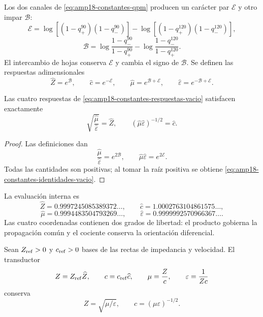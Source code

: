 Los dos canales de \eqref{eq:amp18-constantes-qpm} producen un carácter par
\(\mathcal E\) y otro impar \(\mathcal B\):
\begin{equation}
 \label{eq:amp18-constantes-e-vacio}
 \mathcal E=
 \log[(1-q_+^{90})(1-q_-^{90})]
 -\log[(1-q_+^{120})(1-q_-^{120})],
\end{equation}
\begin{equation}
 \label{eq:amp18-constantes-b-vacio}
 \mathcal B=
 \log\frac{1-q_-^{90}}{1-q_+^{90}}
 -\log\frac{1-q_-^{120}}{1-q_+^{120}}.
\end{equation}
El intercambio de hojas conserva \(\mathcal E\) y cambia el signo de
\(\mathcal B\). Se definen las respuestas adimensionales
\begin{equation}
 \label{eq:amp18-constantes-respuestas-vacio}
 \widehat Z=e^{\mathcal B},\qquad
 \widehat c=e^{-\mathcal E},\qquad
 \widehat\mu=e^{\mathcal B+\mathcal E},\qquad
 \widehat\varepsilon=e^{-\mathcal B+\mathcal E}.
\end{equation}

\begin{theorem}
Las cuatro respuestas de
\eqref{eq:amp18-constantes-respuestas-vacio} satisfacen exactamente
\begin{equation}
 \label{eq:amp18-constantes-identidades-vacio}
 \boxed{
 \sqrt{\frac{\widehat\mu}{\widehat\varepsilon}}=\widehat Z,
 \qquad
 (\widehat\mu\widehat\varepsilon)^{-1/2}=\widehat c.}
\end{equation}
\end{theorem}

\begin{proof}
Las definiciones dan
\[
 \frac{\widehat\mu}{\widehat\varepsilon}=e^{2\mathcal B},
 \qquad
 \widehat\mu\widehat\varepsilon=e^{2\mathcal E}.
\]
Todas las cantidades son positivas; al tomar la raíz positiva se obtiene
\eqref{eq:amp18-constantes-identidades-vacio}.
\end{proof}

La evaluación interna es
\[
 \widehat Z=0.9997245085389372\ldots,
 \qquad
 \widehat c=1.0002763104861575\ldots,
\]
\[
 \widehat\mu=0.9994483504793269\ldots,
 \qquad
 \widehat\varepsilon=0.9999992570966367\ldots.
\]
Las cuatro coordenadas contienen dos grados de libertad: el producto gobierna
la propagación común y el cociente conserva la orientación diferencial.

Sean \(Z_{\rm ref}>0\) y \(c_{\rm ref}>0\) bases de las rectas de
impedancia y velocidad. El transductor
\[
 Z=Z_{\rm ref}\widehat Z,
 \qquad c=c_{\rm ref}\widehat c,
 \qquad \mu=\frac Zc,
 \qquad \varepsilon=\frac1{Zc}
\]
conserva
\[
 Z=\sqrt{\mu/\varepsilon},
 \qquad c=(\mu\varepsilon)^{-1/2}.
\]

